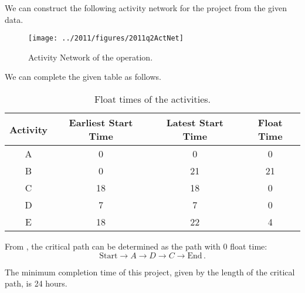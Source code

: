 \begin{subquestions}
\subquestion

\begin{subsubquestions}
	
\subsubquestion

We can construct the following activity network for the project from the given data.
\begin{figure}[H]
	\begin{center}
		\texttt{[image: ../2011/figures/2011q2ActNet]}
		\caption{\label{2011:q2:fig:ActNet} Activity Network of the operation.}
	\end{center}
\end{figure}


\subsubquestion

We can complete the given table as follows.
\begin{table}[h]
	\centering
	\begin{tabular}{|c|c|c|c|}
		\hline
		Activity & Earliest Start Time & Latest Start Time & Float Time \\
		\hline
		A & 0 & 0 & 0 \\
		B & 0 & 21 & 21 \\
		C & 18 & 18 & 0 \\
		D & 7 & 7 & 0 \\
		E & 18 & 22 & 4 \\
		\hline
	\end{tabular}
	\caption{\label{2011:q2:tab:Table1} Float times of the activities.}
\end{table}
	

\subsubquestion

\begin{subsubsubquestions}
	
\subsubsubquestion

From , the critical path can be determined as the path with 0 float time:
\begin{equation}
	\text{Start} \rightarrow A \rightarrow D \rightarrow C \rightarrow \text{End}\,.
\end{equation}


\subsubsubquestion

The minimum completion time of this project, given by the length of the critical path, is 24 hours.

\end{subsubsubquestions}

\end{subsubquestions}

\end{subquestions}


